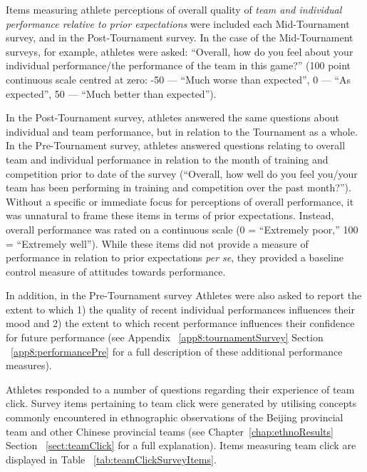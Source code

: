 \begin{CJK}{UTF8}{gbsn}
Items measuring athlete perceptions of overall quality of \textit{team and individual performance relative to prior expectations} were included each Mid-Tournament survey, and in the Post-Tournament survey.  In the case of the Mid-Tournament surveys, for example, athletes were asked: ``Overall, how do you feel about your individual performance/the performance of the team in this game?'' (100 point continuous scale centred at zero: -50 --- ``Much worse than expected'', 0 --- ``As expected'', 50 ---  ``Much better than expected'').

In the Post-Tournament survey, athletes answered the same questions about individual and team performance, but in relation to the Tournament as a whole.  In the Pre-Tournament survey, athletes answered questions relating to overall team and individual performance in relation to the month of training and competition prior to date of the survey (``Overall, how well do you feel you/your team has been performing in training and competition over the past month?'').
Without a specific or immediate focus for perceptions of overall performance, it was unnatural to frame these items in terms of prior expectations.  Instead, overall performance was rated on a continuous scale (0 = ``Extremely poor,'' 100 = ``Extremely well'').  While these items did not provide a measure of performance in relation to prior expectations \textit{per se}, they provided a baseline control measure of attitudes towards performance.

In addition, in the Pre-Tournament survey Athletes were also asked to report the extent to which 1) the quality of recent individual performances influences their mood and 2) the extent to which recent performance influences their confidence for future performance (see Appendix ~\ref{app8:tournamentSurvey} Section ~\ref{app8:performancePre} for a full description of these additional performance measures).

Athletes responded to a number of questions regarding their experience of team click.  Survey items pertaining to team click were generated by utilising concepts commonly encountered in ethnographic observations of the Beijing provincial team and other Chinese provincial teams (see Chapter~\ref{chap:ethnoResults} Section ~\ref{sect:teamClick} for a full explanation).  Items measuring team click are displayed in Table ~\ref{tab:teamClickSurveyItems}.




\end{CJK}
